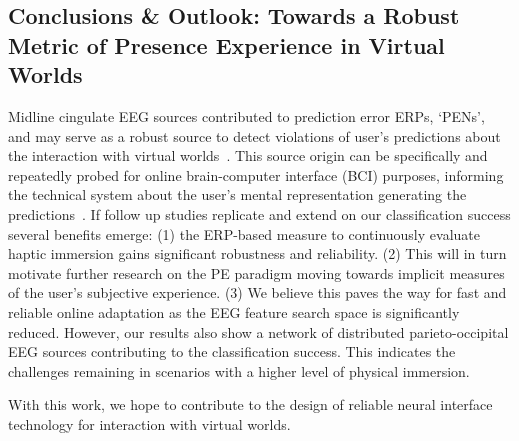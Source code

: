 \subsection{Conclusions \& Outlook: Towards a Robust Metric of Presence Experience in Virtual Worlds}

Midline cingulate EEG sources contributed to prediction error ERPs, `PENs', and may serve as a robust source to detect violations of user's predictions about the interaction with virtual worlds~\cites{Gehrke2019-og, Si-mohammed2020-ru, Zander2016-ed}. This source origin can be specifically and repeatedly probed for online brain-computer interface (BCI) purposes, informing the technical system about the user's mental representation generating the predictions~\cites{Krol2020-lj, Zander2016-ed}. If follow up studies replicate and extend on our classification success several benefits emerge: (1) the ERP-based measure to continuously evaluate haptic immersion gains significant robustness and reliability. (2) This will in turn motivate further research on the PE paradigm moving towards implicit measures of the user's subjective experience. (3) We believe this paves the way for fast and reliable online adaptation as the EEG feature search space is significantly reduced. However, our results also show a network of distributed parieto-occipital EEG sources contributing to the classification success. This indicates the challenges remaining in scenarios with a higher level of physical immersion. 

With this work, we hope to contribute to the design of reliable neural interface technology for interaction with virtual worlds.




